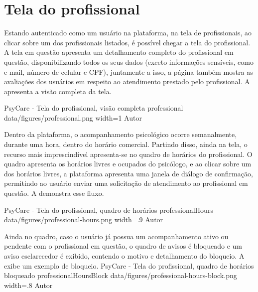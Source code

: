 \section{Tela do profissional}
\label{sec:profissional}

Estando autenticado como um usuário na plataforma, na tela de profissionais, ao clicar sobre um dos profissionais listados, é possível chegar a tela do profissional. A tela em questão apresenta um detalhamento completo do profissional em questão, disponibilizando todos os seus dados (exceto informações sensíveis, como e-mail, número de celular e CPF), juntamente a isso, a página também mostra as avaliações dos usuários em respeito ao atendimento prestado pelo profissional. A  apresenta a visão completa da tela.

\image
    {PsyCare - Tela do profissional, visão completa}
    {professional}
    {data/figures/professional.png}
    {width=1\textwidth}
    {Autor}

Dentro da plataforma, o acompanhamento psicológico ocorre semanalmente, durante uma hora, dentro do horário comercial. Partindo disso, ainda na tela, o recurso mais imprescindível apresenta-se no quadro de horários do profissional. O quadro apresenta os horários livres e ocupados do psicólogo, e ao clicar sobre um dos horários livres, a plataforma apresenta uma janela de diálogo de confirmação, permitindo ao usuário enviar uma solicitação de atendimento ao profissional em questão. A  demonstra esse fluxo.

\image
    {PsyCare - Tela do profissional, quadro de horários}
    {professionalHours}
    {data/figures/professional-hours.png}
    {width=.9\textwidth}
    {Autor}

Ainda no quadro, caso o usuário já possua um acompanhamento ativo ou pendente com o profissional em questão, o quadro de avisos é bloqueado e um aviso esclarecedor é exibido, contendo o motivo e detalhamento do bloqueio. A  exibe um exemplo de bloqueio.
\image
    {PsyCare - Tela do profissional, quadro de horários bloqueado}
    {professionalHoursBlock}
    {data/figures/professional-hours-block.png}
    {width=.8\textwidth}
    {Autor}